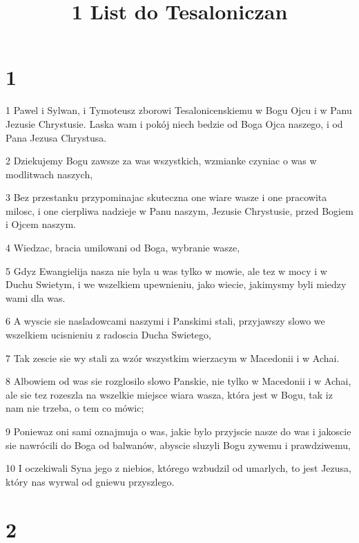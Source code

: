 

\title{1 List do Tesaloniczan}


\chapter{1}

\par 1 Pawel i Sylwan, i Tymoteusz zborowi Tesalonicenskiemu w Bogu Ojcu i w Panu Jezusie Chrystusie. Laska wam i pokój niech bedzie od Boga Ojca naszego, i od Pana Jezusa Chrystusa.
\par 2 Dziekujemy Bogu zawsze za was wszystkich, wzmianke czyniac o was w modlitwach naszych,
\par 3 Bez przestanku przypominajac skuteczna one wiare wasze i one pracowita milosc, i one cierpliwa nadzieje w Panu naszym, Jezusie Chrystusie, przed Bogiem i Ojcem naszym.
\par 4 Wiedzac, bracia umilowani od Boga, wybranie wasze,
\par 5 Gdyz Ewangielija nasza nie byla u was tylko w mowie, ale tez w mocy i w Duchu Swietym, i we wszelkiem upewnieniu, jako wiecie, jakimysmy byli miedzy wami dla was.
\par 6 A wyscie sie nasladowcami naszymi i Panskimi stali, przyjawszy slowo we wszelkiem ucisnieniu z radoscia Ducha Swietego,
\par 7 Tak zescie sie wy stali za wzór wszystkim wierzacym w Macedonii i w Achai.
\par 8 Albowiem od was sie rozglosilo slowo Panskie, nie tylko w Macedonii i w Achai, ale sie tez rozeszla na wszelkie miejsce wiara wasza, która jest w Bogu, tak iz nam nie trzeba, o tem co mówic;
\par 9 Poniewaz oni sami oznajmuja o was, jakie bylo przyjscie nasze do was i jakoscie sie nawrócili do Boga od balwanów, abyscie sluzyli Bogu zywemu i prawdziwemu,
\par 10 I oczekiwali Syna jego z niebios, którego wzbudzil od umarlych, to jest Jezusa, który nas wyrwal od gniewu przyszlego.

\chapter{2}


